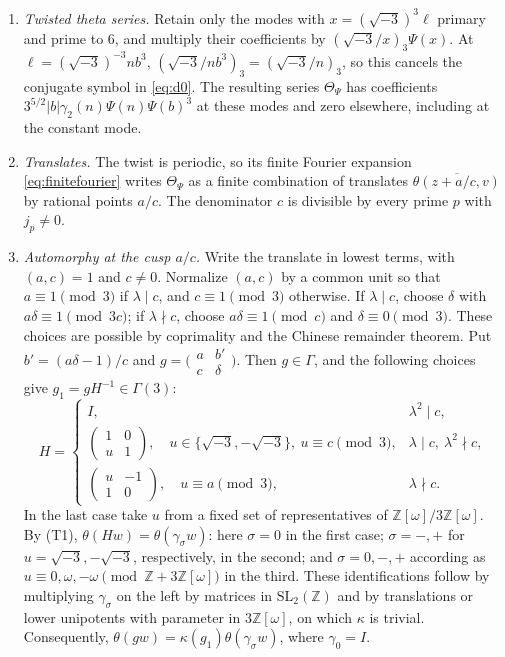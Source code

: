 \documentclass[11pt]{article}
\numberwithin{equation}{section}
\newcommand{\OO}{\mathbb Z[\omega]}
\newcommand{\Z}{\mathbb Z}
\theoremstyle{definition}
\theoremstyle{remark}
\begin{document}
\begin{enumerate}
\item \emph{Twisted theta series.} Retain only the modes with $x=(\sqrt{-3})^3\ell$ primary and prime to $6$,
and multiply their coefficients by $(\sqrt{-3}/x)_3\Psi(x)$. At $\ell=(\sqrt{-3})^{-3}nb^3$,
$(\sqrt{-3}/nb^3)_3=(\sqrt{-3}/n)_3$, so this cancels the conjugate symbol in \eqref{eq:d0}.
The resulting series $\Theta_\Psi$ has coefficients $3^{5/2}|b|\gamma_2(n)\Psi(n)\Psi(b)^3$ at these modes
and zero elsewhere, including at the constant mode.
\item \emph{Translates.} The twist is periodic, so its finite Fourier expansion \eqref{eq:finitefourier} writes
$\Theta_\Psi$ as a finite combination of translates $\overline{\theta(z+a/c,v)}$ by rational points $a/c$. The
denominator $c$ is divisible by every prime $p$ with $j_p\ne0$.
\item \emph{Automorphy at the cusp $a/c$.} Write the translate in lowest terms, with $(a,c)=1$ and $c\ne0$.
Normalize $(a,c)$ by a common unit so that $a\equiv1\pmod3$ if $\lambda\mid c$, and $c\equiv1\pmod3$ otherwise.
If $\lambda\mid c$, choose $\delta$ with $a\delta\equiv1\pmod{3c}$; if $\lambda\nmid c$, choose
$a\delta\equiv1\pmod c$ and $\delta\equiv0\pmod3$. These choices are possible by coprimality and the
Chinese remainder theorem. Put $b'=(a\delta-1)/c$ and $g=\bigl(\begin{smallmatrix}a&b'\\c&\delta\end{smallmatrix}\bigr)$.
Then $g\in\Gamma$, and the following choices give $g_1=gH^{-1}\in\Gamma(3)$:
\begin{equation}\label{eq:cuspnormalization}
 H=\begin{cases}
 I,&\lambda^2\mid c,\\[3pt]
 \begin{pmatrix}1&0\\u&1\end{pmatrix},\quad
 u\in\{\sqrt{-3},-\sqrt{-3}\},\ u\equiv c\pmod3,
 &\lambda\mid c,\ \lambda^2\nmid c,\\[7pt]
 \begin{pmatrix}u&-1\\1&0\end{pmatrix},\quad u\equiv a\pmod3,
 &\lambda\nmid c.
 \end{cases}
\end{equation}
In the last case take $u$ from a fixed set of representatives of $\OO/3\OO$.
By (T1), $\theta(Hw)=\theta(\gamma_\sigma w)$: here $\sigma=0$ in the first case; $\sigma=-,+$ for
$u=\sqrt{-3},-\sqrt{-3}$, respectively, in the second; and $\sigma=0,-,+$ according as
$u\equiv0,\omega,-\omega\pmod{\Z+3\OO}$ in the third. These identifications follow by multiplying
$\gamma_\sigma$ on the left by matrices in $\mathrm{SL}_2(\Z)$ and by translations or lower unipotents
with parameter in $3\OO$, on which $\kappa$ is trivial. Consequently,
$\theta(gw)=\kappa(g_1)\theta(\gamma_\sigma w)$, where $\gamma_0=I$.


\end{enumerate}
\end{document}
